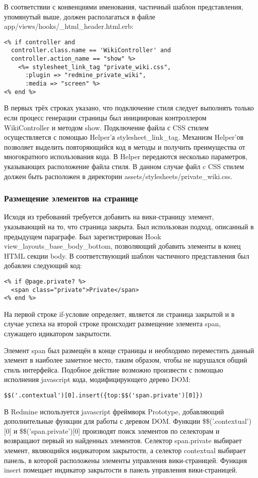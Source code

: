 В соответствии с конвенциями именования, частичный шаблон представления,
упомянутый выше, должен располагаться в файле
app/views/hooks/\_html\_header.html.erb:
\small{\begin{lstlisting}
<% if controller and
  controller.class.name == 'WikiController' and
  controller.action_name == "show" %>
    <%= stylesheet_link_tag "private_wiki.css",
      :plugin => "redmine_private_wiki",
      :media => "screen" %>
<% end %>
\end{lstlisting}}
В первых трёх строках указано, что подключение стиля следует выполнять только
если процесс генерации страницы был инициирован контроллером WikiController и
методом show. Подключение файла с CSS стилем осуществляется с помощью Helper'а
stylesheet\_link\_tag. Механизм Helper'ов позволяет выделить повторяющийся код
в методы и получить преимущества от многократного использования кода. В Helper
передаются несколько параметров, указывающих расположение файла стиля. В
данном случае файл c CSS стилем должен быть расположен в директории
assets/stylesheets/private\_wiki.css.

\subsubsection{Размещение элементов на странице}
Исходя из требований требуется добавить на вики-страницу элемент, указывающий
на то, что страница закрыта. Был использован подход, описанный в предыдущем
параграфе. Был зарегистрирован Hook view\_layouts\_base\_body\_bottom,
позволяющий добавить элементы в конец HTML секции body. В соответствующий
шаблон частичного представления был добавлен следующий код:
\small{\begin{lstlisting}
<% if @page.private? %>
  <span class="private">Private</span>
<% end %>
\end{lstlisting}}
На первой строке if-условие определяет, является ли страница закрытой и в
случае успеха на второй строке происходит размещение элемента span,
служащего идикатором закрытости.

Элемент span был размещён в конце страницы и необходимо переместить данный
элемент в наиболее заметное место, таким образом, чтобы не нарушался общий
стиль интерфейса. Подобное действие возможно произвести с помощью исполнения
javascript кода, модифицирующего дерево DOM:
\small{\begin{lstlisting}
$$('.contextual')[0].insert({top:$$('span.private')[0]})
\end{lstlisting}}
В Redmine используется javascript фреймворк Prototype, добавляющий
дополнительные функции для работы с деревом DOM. Функции \$\$('.contextual')[0]
и \$\$('span.private')[0] производят поиск элементов по селекторам и возвращают
первый из найденных элементов. Селектор span.private выбирает элемент,
являющийся индикатором закрытости, а селектор contextual выбирает панель, в
которой расположены элементы управления вики-страницей. Функция insert помещает
индикатор закрытости в панель управления вики-страницей.


